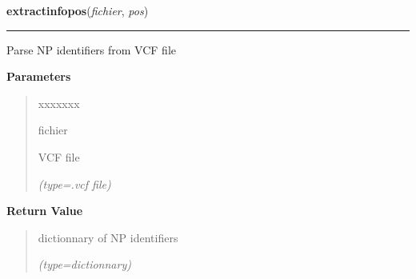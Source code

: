 \hspace{.8\funcindent}\begin{boxedminipage}{\funcwidth}

    \raggedright \textbf{extractinfopos}(\textit{fichier}, \textit{pos})

    \vspace{-1.5ex}

    \rule{\textwidth}{0.5\fboxrule}
\setlength{\parskip}{2ex}
    Parse NP identifiers from VCF file

\setlength{\parskip}{1ex}
      \textbf{Parameters}
      \vspace{-1ex}

      \begin{quote}
        \begin{Ventry}{xxxxxxx}

          \item[fichier]

          VCF file

            {\it (type=.vcf file)}

        \end{Ventry}

      \end{quote}

      \textbf{Return Value}
    \vspace{-1ex}

      \begin{quote}
      dictionnary of NP identifiers

      {\it (type=dictionnary)}

      \end{quote}

    \end{boxedminipage}

    \label{VCFtoGO:idmapping}

    \vspace{0.5ex}

